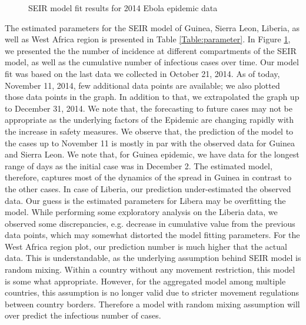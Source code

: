 \documentclass[10pt, journal,onecolumn]{IEEEtran}
\begin{document}
\begin{figure}[ht]
{  \label{fig:subfigure3}}
\quad
{}

\caption{SEIR model fit results for 2014 Ebola epidemic data}
\label{Fig:figurePrediction}
\end{figure}


The estimated parameters for the SEIR model of Guinea, Sierra Leon, Liberia, as well as West Africa region is presented in Table \ref{Table:parameter}. In Figure \ref{Fig:figurePrediction}, we presented the the number of incidence at different compartments of the SEIR model, as well as the cumulative number of infectious cases over time. Our model fit was based on the last data we collected in October 21, 2014. As of today, November 11, 2014, few additional data points are available; we also plotted those data points in the graph. In addition to that, we extrapolated the graph up to December 31, 2014. We note that, the forecasting to future cases may not be appropriate as the underlying factors of the Epidemic are changing rapidly with the increase in safety measures. We observe that, the prediction of the model to the cases up to November 11 is mostly in par with the observed data for Guinea and Sierra Leon. We note that, for Guinea epidemic, we have data for the longest range of days as the initial case was in December 2. The estimated model, therefore, captures most of the dynamics of the spread in Guinea in contrast to the other cases. In case of Liberia, our prediction under-estimated the observed data. Our guess is the estimated parameters for Libera may be overfitting the model. While performing some exploratory analysis on the Liberia data, we observed some discrepancies, e.g. decrease in cumulative value from the previous data points, which may somewhat distorted the model fitting parameters. For the West Africa region plot, our prediction number is much higher that the actual data. This is understandable, as the underlying assumption behind SEIR model is random mixing.  Within a country without any movement restriction, this model is some what appropriate. However, for the aggregated model among multiple countries, this assumption is no longer valid due to stricter movement regulations between country borders. Therefore a model with random mixing assumption will over predict the infectious number of cases.
\end{document}
